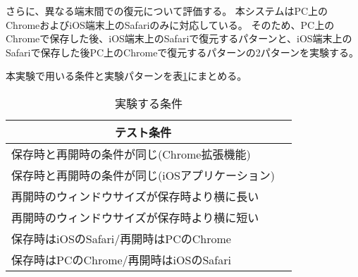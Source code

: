 さらに、異なる端末間での復元について評価する。
本システムはPC上のChromeおよびiOS端末上のSafariのみに対応している。
そのため、PC上のChromeで保存した後、iOS端末上のSafariで復元するパターンと、iOS端末上のSafariで保存した後PC上のChromeで復元するパターンの2パターンを実験する。

本実験で用いる条件と実験パターンを表\ref{tb:evl-scroll-position}にまとめる。

\begin{table}[htbp]
  \label{tb:evl-scroll-position}
  \caption{実験する条件}
  \begin{center}
    \begin{tabular}{|l|l|}
    \hline
    \multicolumn{1}{|c|}{\textbf{テスト条件}} \\\hline
    保存時と再開時の条件が同じ(Chrome拡張機能) \\ \hline
    保存時と再開時の条件が同じ(iOSアプリケーション) \\ \hline
    再開時のウィンドウサイズが保存時より横に長い  \\ \hline
    再開時のウィンドウサイズが保存時より横に短い  \\ \hline
    保存時はiOSのSafari/再開時はPCのChrome \\ \hline
    保存時はPCのChrome/再開時はiOSのSafari \\ \hline
    \end{tabular}
  \end{center}
\end{table}

